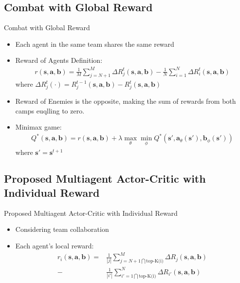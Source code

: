 \documentclass[mathserif]{beamer}
\begin{document}
\subsection{Combat with Global Reward}
\begin{frame}{Combat with Global Reward}
\begin{itemize}
  \item Each agent in the same team shares the same reward
  \item Reward of Agents Definition:
  \begin{align}
    r(\bm{s},\bm{a},\bm{b})=\frac{1}{M}\sum_{j=N+1}^{M}\Delta R_{j}^{t}(\bm{s},\bm{a},\bm{b})-
    \frac{1}{N}\sum_{i=1}^{N}\Delta R_{i}^{t}(\bm{s},\bm{a},\bm{b})
  \end{align}
  where $\Delta R_{j}^{t}(\cdot)=R_{j}^{t-1}(\bm{s},\bm{a},\bm{b})-R_{j}^{t}(\bm{s},\bm{a},\bm{b})$
  \item Reward of Enemies is the opposite, making the sum of rewards from both camps euqlling to zero.
  \item Minimax game:
  \begin{align}
    Q^{*}(\bm{s},\bm{a},\bm{b})=r(\bm{s},\bm{a},\bm{b})+\lambda\max_{\theta}\min_{\phi}Q^{*}(\bm{s'},\bm{a}_{\theta}(\bm{s'}),\bm{b}_{\phi}(\bm{s'}))
  \end{align}
  where $\bm{s'}=\bm{s}^{t+1}$
\end{itemize}
\end{frame}
\subsection{Proposed Multiagent Actor-Critic with Individual Reward}
\begin{frame}{Proposed Multiagent Actor-Critic with Individual Reward}
  \begin{itemize}
    \item Considering team collaboration
    \item Each agent's local reward:
    \begin{align}
      r_{i}(\bm{s},\bm{a},\bm{b})=&\frac{1}{|j|}\sum_{j=N+1\bigcap\text{top-K(i)}}^{M}\Delta R_{j}(\bm{s},\bm{a},\bm{b})\\
      -&\frac{1}{|i'|}
      \sum_{i'=1\bigcap\text{top-K(i)}}^{N}\Delta R_{i'}(\bm{s},\bm{a},\bm{b})
    \end{align}
  \end{itemize}
\end{frame}
\end{document}
